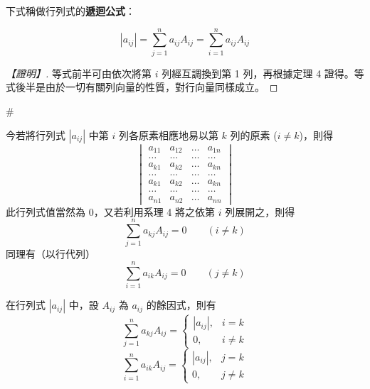 下式稱做行列式的\textbf{遞迴公式}：

\begin{corollary}\label{cor:b6-1-5}
\begin{equation}
|a_{ij}| = \sum_{j=1}^n a_{ij} A_{ij} = \sum_{i=1}^n a_{ij} A_{ij} \label{eq:b6-1-6-15}
\end{equation}
\end{corollary}

\begin{proof}[【證明】]
等式前半可由依次將第 $i$ 列經互調換到第 1 列，再根據定理 4 證得。等式後半是由於一切有關列向量的性質，對行向量同樣成立。
\end{proof}\hfill$\#$

今若將行列式 $|a_{ij}|$ 中第 $i$ 列各原素相應地易以第 $k$ 列的原素 ($i \ne k$)，則得
\begin{equation}
\begin{vmatrix}
a_{11} & a_{12} & \dots & a_{1n} \\
\dots & \dots & \dots & \dots \\
a_{k1} & a_{k2} & \dots & a_{kn} \\
\dots & \dots & \dots & \dots \\
a_{k1} & a_{k2} & \dots & a_{kn} \\
\dots & \dots & \dots & \dots \\
a_{n1} & a_{n2} & \dots & a_{nn}
\end{vmatrix} \label{eq:b6-1-6-16}
\end{equation}
此行列式值當然為 0，又若利用系理 4 將之依第 $i$ 列展開之，則得
\[ \sum_{j=1}^n a_{kj} A_{ij} = 0 \qquad (i \ne k) \]
同理有（以行代列）
\[ \sum_{i=1}^n a_{ik} A_{ij} = 0 \qquad (j \ne k) \]

\begin{theorem}\label{thm:b6-1-16}
在行列式 $|a_{ij}|$ 中，設 $A_{ij}$ 為 $a_{ij}$ 的餘因式，則有
\begin{equation}
\sum_{j=1}^n a_{kj} A_{ij} = \begin{cases}
|a_{ij}|, & i = k \\
0, & i \ne k
\end{cases} \label{eq:b6-1-6-17}
\end{equation}
\begin{equation}
\sum_{i=1}^n a_{ik} A_{ij} = \begin{cases}
|a_{ij}|, & j = k \\
0, & j \ne k
\end{cases} \label{eq:b6-1-6-18}
\end{equation}
\end{theorem}

